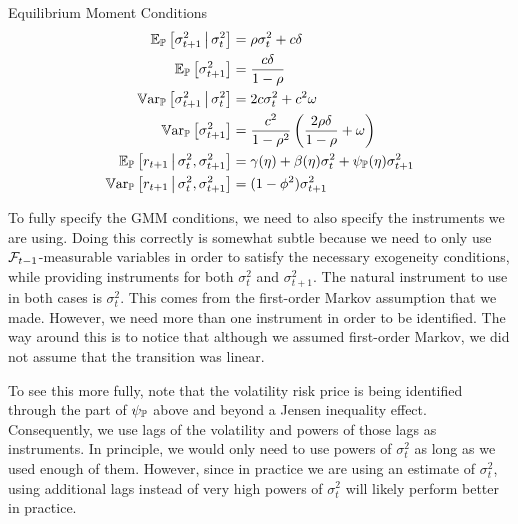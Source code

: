\documentclass[11pt, letterpaper, twoside, final]{article}
\begin{document}
\begin{defn}{Equilibrium Moment Conditions}
    \label{defn:equilibrium_moment_conditions}
    \begin{align}
        \label{eqn:cond_vol_mean}
        \E_{\PP}\left[\sigma^2_{t+1} \mvert \sigma^2_t \right]  &= \rho \sigma^2_t  + c \delta\\
%
        \label{eqn:global_vol_mean}
        \E_{\PP}\left[\sigma^2_{t+1}\right]  &= \frac{c \delta}{1 - \rho} \\
%
        \label{eqn:cond_vol_var}
        \Var_{\PP}\left[\sigma^2_{t+1} \mvert \sigma^2_t \right]  &=  2 c \sigma^2_t  + c^2 \omega \\
%
        \label{eqn:global_vol_var}
        \Var_{\PP}\left[\sigma^2_{t+1} \right]  &=  \frac{c^2}{1 - \rho^2}  \left(\frac{2 \rho \delta}{1 - \rho}  +
        \omega \right)  \\
%
        \label{eqn:cond_expected_rtn_moment}
        \E_{\PP}\left[r_{t+1} \mvert \sigma^2_t, \sigma^2_{t+1}\right] &= \gamma(\eta) + \beta(\eta) \sigma^2_t +
        \psi_{\PP}(\eta) \sigma^2_{t+1} \\
%
        \label{eqn:cond_rtn_var}
        \Var_{\PP}\left[r_{t+1} \mvert \sigma^2_t, \sigma^2_{t+1}\right] &= (1 - \phi^2) \sigma^2_{t+1} 
\end{align}
\end{defn}

To fully specify the GMM conditions, we need to also specify the instruments we are using.
Doing this correctly is somewhat subtle because we need to only use $\mathcal{F}_{t-1}$-measurable variables in order to
satisfy the necessary exogeneity conditions, while providing instruments for both $\sigma^2_t$ and
$\sigma^2_{t+1}$. 
The natural instrument to use in both cases is $\sigma^2_t$.
This comes from the first-order Markov assumption that we made.
However, we need more than one instrument in order to be identified.
The way around this is to notice that although we assumed first-order Markov, we did not assume that the
transition was linear. 

To see this more fully, note that the volatility risk price is being identified through the part of $\psi_{\mathbb{P}}$
above and beyond a Jensen inequality effect.
Consequently, we use lags of the volatility and powers of those lags as instruments.
In principle, we would only need to use powers of $\sigma^2_t$ as long as we used enough of them.
However, since in practice we are using an estimate of $\sigma^2_t$, using additional lags instead of very high
powers of $\sigma^2_t$ will likely perform better in practice.
\end{document}
